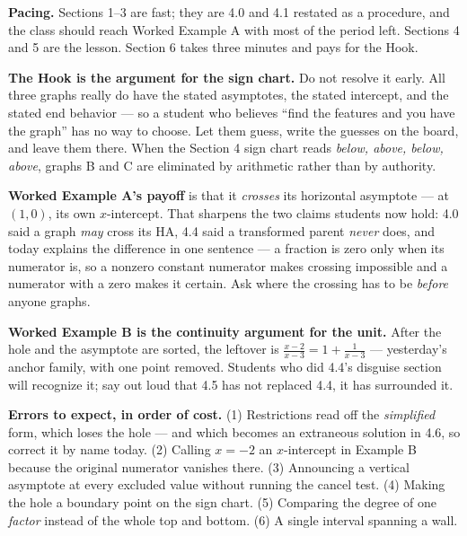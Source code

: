 \documentclass[10pt]{article}
\begin{document}
\begin{teachernote}
\textbf{Pacing.} Sections 1--3 are fast; they are 4.0 and 4.1 restated as a procedure, and the class
should reach Worked Example A with most of the period left. Sections 4 and 5 are the lesson. Section 6
takes three minutes and pays for the Hook.

\vspace{3pt}
\textbf{The Hook is the argument for the sign chart.} Do not resolve it early. All three graphs really
do have the stated asymptotes, the stated intercept, and the stated end behavior --- so a student who
believes ``find the features and you have the graph'' has no way to choose. Let them guess, write the
guesses on the board, and leave them there. When the Section 4 sign chart reads \emph{below, above,
below, above}, graphs B and C are eliminated by arithmetic rather than by authority.

\vspace{3pt}
\textbf{Worked Example A's payoff} is that it \emph{crosses} its horizontal asymptote --- at $(1,0)$,
its own $x$-intercept. That sharpens the two claims students now hold: 4.0 said a graph \emph{may}
cross its HA, 4.4 said a transformed parent \emph{never} does, and today explains the difference in one
sentence --- a fraction is zero only when its numerator is, so a nonzero constant numerator makes
crossing impossible and a numerator with a zero makes it certain. Ask where the crossing has to be
\emph{before} anyone graphs.

\vspace{3pt}
\textbf{Worked Example B is the continuity argument for the unit.} After the hole and the asymptote are
sorted, the leftover is $\frac{x-2}{x-3}=1+\frac{1}{x-3}$ --- yesterday's anchor family, with one point
removed. Students who did 4.4's disguise section will recognize it; say out loud that 4.5 has not
replaced 4.4, it has surrounded it.

\vspace{3pt}
\textbf{Errors to expect, in order of cost.} (1) Restrictions read off the \emph{simplified} form, which
loses the hole --- and which becomes an extraneous solution in 4.6, so correct it by name today.
(2) Calling $x=-2$ an $x$-intercept in Example B because the original numerator vanishes there.
(3) Announcing a vertical asymptote at every excluded value without running the cancel test.
(4) Making the hole a boundary point on the sign chart. (5) Comparing the degree of one \emph{factor}
instead of the whole top and bottom. (6) A single interval spanning a wall.
\end{teachernote}
\end{document}
